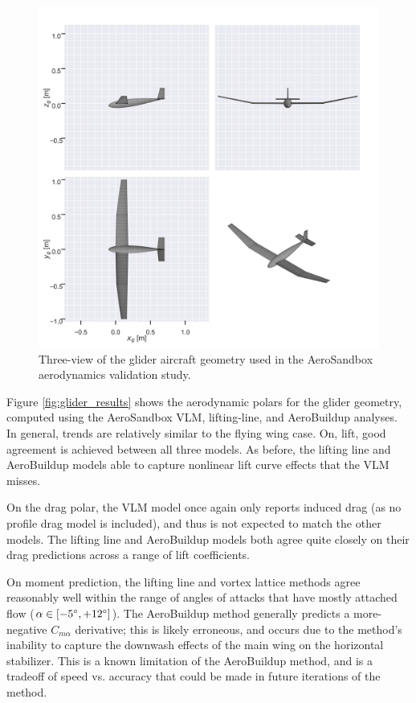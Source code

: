 \begin{figure}[!htb]
    \centering
    \includegraphics[width=5in]{../figures/aero_validation/glider_geometry.png}
    \caption{Three-view of the glider aircraft geometry used in the AeroSandbox aerodynamics validation study.}
    \label{fig:glider_geometry}
\end{figure}

Figure \ref{fig:glider_results} shows the aerodynamic polars for the glider geometry, computed using the AeroSandbox VLM, lifting-line, and AeroBuildup analyses. In general, trends are relatively similar to the flying wing case. On, lift, good agreement is achieved between all three models. As before, the lifting line and AeroBuildup models able to capture nonlinear lift curve effects that the VLM misses.

On the drag polar, the VLM model once again only reports induced drag (as no profile drag model is included), and thus is not expected to match the other models. The lifting line and AeroBuildup models both agree quite closely on their drag predictions across a range of lift coefficients.

On moment prediction, the lifting line and vortex lattice methods agree reasonably well within the range of angles of attacks that have mostly attached flow ($\alpha \in [-5\degree, +12\degree]$). The AeroBuildup method generally predicts a more-negative $C_{m\alpha}$ derivative; this is likely erroneous, and occurs due to the method's inability to capture the downwash effects of the main wing on the horizontal stabilizer. This is a known limitation of the AeroBuildup method, and is a tradeoff of speed vs. accuracy that could be made in future iterations of the method.

